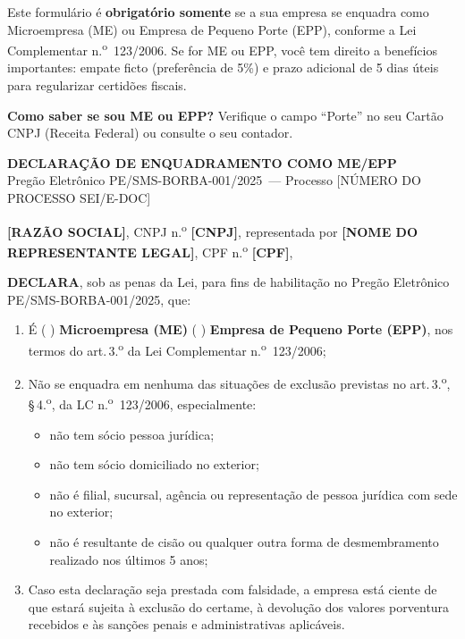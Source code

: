 \documentclass[12pt,a4paper]{article}
\newcommand{\art}[1]{art.\,#1}
\newcommand{\editalRef}{PE/SMS-BORBA-001/2025}
\newcommand{\procNum}{[NÚMERO DO PROCESSO SEI/E-DOC]}
\begin{document}
\begin{dicabox}
\small
Este formulário é \textbf{obrigatório somente} se a sua empresa se enquadra como
Microempresa (ME) ou Empresa de Pequeno Porte (EPP), conforme a Lei Complementar
n.\textsuperscript{o}~123/2006. Se for ME ou EPP, você tem direito a benefícios
importantes: empate ficto (preferência de 5\%) e prazo adicional de 5 dias úteis
para regularizar certidões fiscais.

\medskip
\textbf{Como saber se sou ME ou EPP?} Verifique o campo ``Porte'' no seu
Cartão CNPJ (Receita Federal) ou consulte o seu contador.
\end{dicabox}

\vspace{0.4cm}
\begin{fillbox}
\begin{center}
  {\bfseries\color{navy}DECLARAÇÃO DE ENQUADRAMENTO COMO ME/EPP}\\[4pt]
  {\small Pregão Eletrônico \editalRef\ --- Processo \procNum}
\end{center}
\end{fillbox}

\bigskip
\noindent\textbf{[RAZÃO SOCIAL]}, CNPJ n.\textsuperscript{o} \textbf{[CNPJ]},
representada por \textbf{[NOME DO REPRESENTANTE LEGAL]}, CPF
n.\textsuperscript{o} \textbf{[CPF]},

\bigskip
\noindent\textbf{DECLARA}, sob as penas da Lei, para fins de habilitação no
Pregão Eletrônico \editalRef, que:

\begin{enumerate}
  \item É ( ) \textbf{Microempresa (ME)} \quad ( ) \textbf{Empresa de Pequeno
    Porte (EPP)}, nos termos do \art{3.\textsuperscript{o}} da Lei Complementar
    n.\textsuperscript{o}~123/2006;

  \item Não se enquadra em nenhuma das situações de exclusão previstas no
    \art{3.\textsuperscript{o}}, \S\,4.\textsuperscript{o}, da LC
    n.\textsuperscript{o}~123/2006, especialmente:
    \begin{itemize}
      \item não tem sócio pessoa jurídica;
      \item não tem sócio domiciliado no exterior;
      \item não é filial, sucursal, agência ou representação de pessoa
        jurídica com sede no exterior;
      \item não é resultante de cisão ou qualquer outra forma de desmembramento
        realizado nos últimos 5 anos;
    \end{itemize}

  \item Caso esta declaração seja prestada com falsidade, a empresa está ciente
    de que estará sujeita à exclusão do certame, à devolução dos valores
    porventura recebidos e às sanções penais e administrativas aplicáveis.
\end{enumerate}
\end{document}
